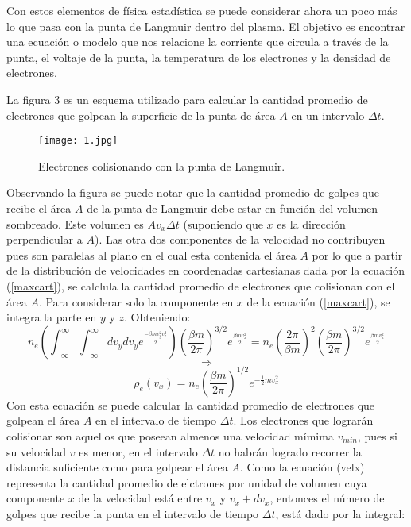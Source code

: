 \documentclass[letterpaper,12pt]{article}
\begin{document}
Con estos elementos de física estadística se puede considerar ahora un poco más lo que pasa con la punta de Langmuir dentro del plasma. El objetivo es encontrar una ecuación o modelo que nos relacione la corriente que circula a través de la punta, el voltaje de la punta, la temperatura de los electrones y la densidad de electrones.

La figura 3 es un esquema utilizado para calcular la cantidad promedio de electrones que golpean la superficie de la punta de área $A$ en un intervalo $\Delta t$.

\begin{figure}[!h]
\centering
\texttt{[image: 1.jpg]}
\caption{Electrones colisionando con la punta de Langmuir.}
\end{figure}

Observando la figura se puede notar que la cantidad promedio de golpes que recibe el área $A$ de la punta de Langmuir debe estar en función del volumen sombreado. Este volumen es $Av_x\Delta t$ (suponiendo que $x$ es la dirección perpendicular a $A$). Las otra dos componentes de la velocidad no contribuyen pues son paralelas al plano en el cual esta contenida el área $A$ por lo que a partir de la distribución de velocidades en coordenadas cartesianas dada por la ecuación (\ref{maxcart}), se calclula la cantidad promedio de electrones que colisionan con el área $A$.
Para considerar solo la componente en $x$ de la ecuación (\ref{maxcart}), se integra la parte en $y$ y $z$. Obteniendo:
\begin{equation*}
n_e\left( \int_{-\infty}^{\infty}\int_{-\infty}^{\infty}dv_y dv_y e^{\frac{-\beta m v_y^2 v_z^2}{2}} \right) \left(\frac{\beta m}{2\pi} \right) ^{3/2}e^{\frac{\beta m v_x^2}{2}}=n_e\left( \frac{2\pi}{\beta m} \right)^2 \left(\frac{\beta m}{2\pi} \right) ^{3/2}e^{\frac{\beta m v_x^2}{2}} 
\end{equation*}
\begin{equation*}
\Rightarrow 
\end{equation*}
\begin{equation}\label{velx}
\rho_e (v_x) =n_e\left( \frac{\beta m}{2 \pi } \right) ^{1/2} e^{-\frac{1}{2}mv_x^2}
\end{equation}
Con esta ecuación se puede calcular la cantidad promedio de electrones que golpean el área $A$ en el intervalo de tiempo $\Delta t$. Los electrones que lograrán colisionar son aquellos que poseean almenos una velocidad mímima $v_{min}$, pues si su velocidad $v$ es menor, en el intervalo $\Delta t$ no habrán logrado recorrer la distancia suficiente como para golpear el área $A$.  Como la ecuación (velx) representa la cantidad promedio de elctrones por unidad de volumen cuya componente $x$ de la velocidad está entre $v_x$ y $v_x+dv_x$, entonces el número de golpes que recibe la punta en el intervalo de tiempo $\Delta t$, está dado por la integral:
\end{document}
